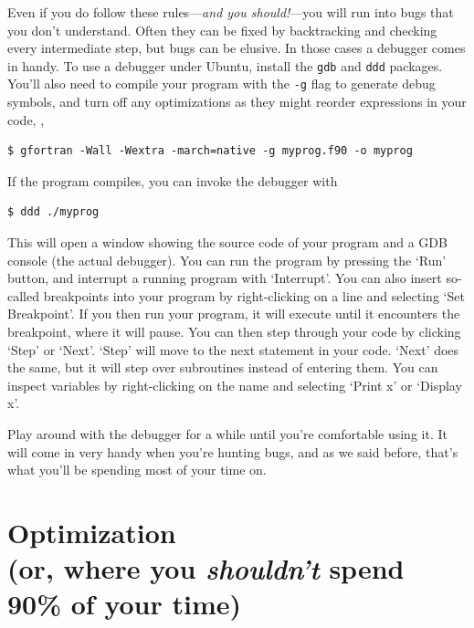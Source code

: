 \documentclass[openany,oneside]{report}
\newcommand{\Chapter}[2]{\chapter[#1]{#1\\[1ex]\Large#2}}
\begin{document}
Even if you do follow these rules---\emph{and you should!}---you will run into bugs that you don't understand.
Often they can be fixed by backtracking and checking every intermediate step, but bugs can be elusive.
In those cases a debugger comes in handy.
To use a debugger under Ubuntu, install the \texttt{gdb} and \texttt{ddd} packages.
You'll also need to compile your program with the \texttt{-g} flag to generate debug symbols, and turn off any optimizations as they might reorder expressions in your code, \eg,
\begin{verbatim}
$ gfortran -Wall -Wextra -march=native -g myprog.f90 -o myprog
\end{verbatim}
If the program compiles, you can invoke the debugger with
\begin{verbatim}
$ ddd ./myprog
\end{verbatim}
This will open a window showing the source code of your program and a GDB console (the actual debugger).
You can run the program by pressing the `Run' button, and interrupt a running program with `Interrupt'.
You can also insert so-called breakpoints into your program by right-clicking on a line and selecting `Set Breakpoint'.
If you then run your program, it will execute until it encounters the breakpoint, where it will pause.
You can then step through your code by clicking `Step' or `Next'.
`Step' will move to the next statement in your code.
`Next' does the same, but it will step over subroutines instead of entering them.
You can inspect variables by right-clicking on the name and selecting `Print x' or `Display x'.

Play around with the debugger for a while until you're comfortable using it.
It will come in very handy when you're hunting bugs, and as we said before, that's what you'll be spending most of your time on.

\Chapter{Optimization}{(or, where you \emph{shouldn't} spend 90\% of your time)}
\label{chap:Optimization}
\end{document}

